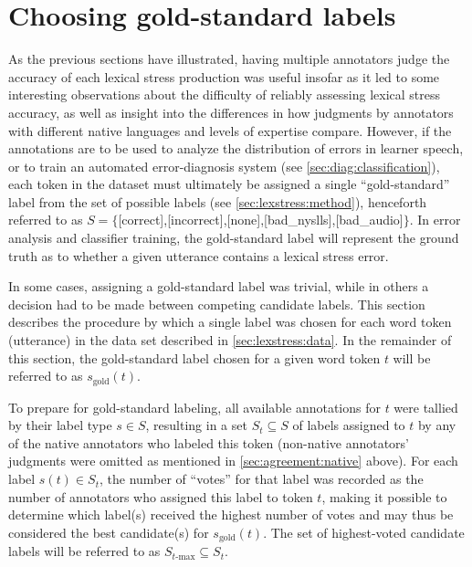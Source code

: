 			
			
		\section{Choosing gold-standard labels}
		\label{sec:agreement:gold}
		
		
		
		As the previous sections have illustrated, having multiple annotators judge the accuracy of each lexical stress production was useful insofar as it led to some interesting observations about the difficulty of reliably assessing lexical stress accuracy, as well as insight into the differences in how judgments by annotators with different native languages and levels of expertise compare. However, if the annotations are to be used to analyze the distribution of errors in learner speech, or to train an automated error-diagnosis system (see \cref{sec:diag:classification}), each token in the dataset must ultimately be assigned a single ``gold-standard'' label from the set of possible labels (see \cref{sec:lexstress:method}), henceforth referred to as $S = \{$[correct],{[incorrect]},{[none]},{[bad\_nyslls]},{[bad\_audio]}$\}$.
		 In error analysis and classifier training, the gold-standard label will represent the ground truth as to whether a given utterance contains a lexical stress error.
		
		In some cases, assigning a gold-standard label was trivial, while in others a decision had to be made between competing candidate labels. This section describes the procedure by which a single label was chosen for each word token (utterance) in the data set described in \cref{sec:lexstress:data}. In the remainder of this section, the gold-standard label chosen for a given word token $t$ will be referred to as $s_{\text{gold}}(t)$.
		
		To prepare for gold-standard labeling, all available annotations for $t$ were tallied by their label type $s \in S$, resulting in a set $S_t \subseteq S$ of labels assigned to $t$ by any of the native annotators who labeled this token (non-native annotators' judgments were omitted as mentioned in \cref{sec:agreement:native} above). For each label $s(t) \in S_t$, the number of ``votes'' for that label was recorded as the number of annotators who assigned this label to token $t$,
		making it possible to determine which label(s) received the highest number of votes and may thus be considered the best candidate(s) for $s_{\text{gold}}(t)$. The set of highest-voted candidate labels will be referred to as $S_{t\text{-max}} \subseteq S_t$.
		
